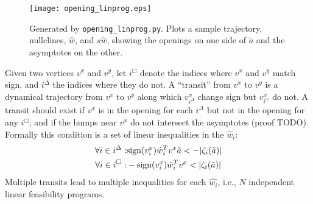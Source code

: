 \documentclass[pdftex,12pt,letterpaper]{article}
\newcommand{\sign}{\text{\upshape{sign}}}
\begin{document}
\begin{figure}
\centering
\texttt{[image: opening\_linprog.eps]}
\caption{Generated by \texttt{opening\_linprog.py}. Plots a sample trajectory, nullclines, $\hat{w}$, and $s\hat{w}$, showing the openings on one side of $\tilde{a}$ and the asymptotes on the other.}
\label{fig:lp}
\end{figure}

Given two vertices $v^x$ and $v^y$, let $i^\Box$ denote the indices where $v^x$ and $v^y$ match sign, and $i^\Delta$ the indices where they do not.  A ``transit'' from $v^x$ to $v^y$ is a dynamical trajectory from $v^x$ to $v^y$ along which $v^x_{i^\Delta}$ change sign but $v^x_{i^\Box}$ do not.  A transit should exist if $v^x$ is in the opening for each $i^\Delta$ but not in the opening for any $i^\Box$, and if the humps near $v^x$ do not intersect the asymptotes (proof TODO).  Formally this condition is a set of linear inequalities in the $\hat{w}_i$:
\begin{align}
\forall i\in i^\Delta:& \sign(v^x_i)\hat{w}^T_iv^x\tilde{a} < -|\zeta_i(\tilde{a})| \\
\forall i\in i^\Box:& -\sign(v^x_i)\hat{w}^T_iv^x < |\zeta_i(\tilde{a})| \\
\end{align}
Multiple transits lead to multiple inequalities for each $\hat{w_i}$, i.e., $N$ independent linear feasibility programs.
\end{document}
